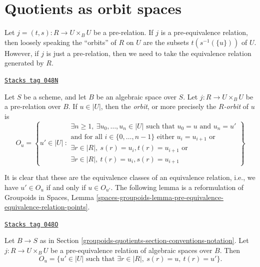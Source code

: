 \section{Quotients as orbit spaces}
\label{groupoids-quotients-section-orbits}
Let $j = (t, s) : R \to U \times_B U$ be a pre-relation.
If $j$ is a pre-equivalence relation, then loosely speaking
the ``orbits'' of $R$ on $U$
are the subsets $t(s^{-1}(\{u\}))$ of $U$. However, if $j$ is just a
pre-relation, then we need to take the equivalence relation generated
by $R$.

\begin{definition}[Orbit]
\label{groupoids-quotients-definition-orbit}
\href{https://stacks.math.columbia.edu/tag/048N}{\texttt{Stacks tag 048N}}

Let $S$ be a scheme, and let $B$ be an algebraic space over $S$.
Let $j : R \to U \times_B U$ be a pre-relation over $B$.
If $u \in |U|$, then the {\it orbit}, or more precisely the
{\it $R$-orbit} of $u$ is
$$
O_u =
\left\{
u' \in |U|\ :
\begin{matrix}
\exists n \geq 1, \ \exists u_0, \ldots, u_n \in |U|\text{ such that }
u_0 = u \text{ and } u_n = u' \\
\text{and for all }i \in \{0, \ldots, n - 1\}\text{ either }
u_i = u_{i + 1}\text{ or } \\
\exists r \in |R|, \ s(r) = u_i, t(r) = u_{i + 1}
\text{ or } \\
\exists r \in |R|, \ t(r) = u_i, s(r) = u_{i + 1}
\end{matrix}
\right\}
$$
\end{definition}

It is clear that these are the equivalence classes of an equivalence relation,
i.e., we have $u' \in O_u$ if and only if $u \in O_{u'}$. The following lemma
is a reformulation of
Groupoids in Spaces,
Lemma \ref{spaces-groupoids-lemma-pre-equivalence-equivalence-relation-points}.

\begin{lemma}
\label{groupoids-quotients-lemma-pre-equivalence-equivalence-relation-points}
\href{https://stacks.math.columbia.edu/tag/048O}{\texttt{Stacks tag 048O}}

Let $B \to S$ as in Section \ref{groupoids-quotients-section-conventions-notation}.
Let $j : R \to U \times_B U$ be a pre-equivalence relation
of algebraic spaces over $B$. Then
$$
O_u =
\{u' \in |U| \text{ such that } \exists r \in |R|, \ s(r) = u, \ t(r) = u'\}.
$$
\end{lemma}

